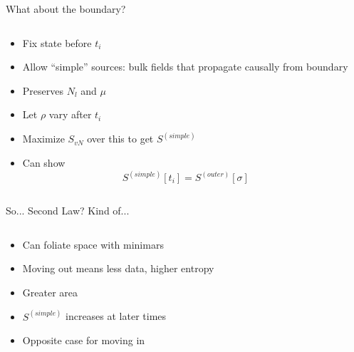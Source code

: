 \documentclass{beamer}
\newcommand{\Sout}{S^{(outer)}}
\begin{document}
  \begin{frame}{What about the boundary?}
    \begin{columns}
      \begin{column}{0.5 \linewidth}
        \begin{itemize}[<+(1)->]
          \item Fix state before $t_i$
          \item Allow ``simple'' sources: bulk fields that propagate causally from boundary
          \item Preserves $N_l$ and $\mu$
          \item Let $\rho$ vary after $t_i$
          \item Maximize $S_{vN}$ over this to get $S^{(simple)}$
          \item Can show $$ S^{(simple)}[t_i] = \Sout[\sigma] $$
        \end{itemize}
      \end{column}
      \begin{column}{0.5 \linewidth}
        
      \end{column}
    \end{columns}
  \end{frame}

  \begin{frame}{So... Second Law?}
    Kind of...
    \vspace{-1em}
    \begin{columns}
      \begin{column}{0.5 \linewidth}
        \begin{itemize}[<+(1)->]
          \item Can foliate space with minimars
          \item Moving out means less data, higher entropy
          \item Greater area
          \item $S^{(simple)}$ increases at later times
          \item Opposite case for moving in 
        \end{itemize}
      \end{column}
      \begin{column}{0.5 \linewidth}
        
      \end{column}
    \end{columns}
  \end{frame}
\end{document}
